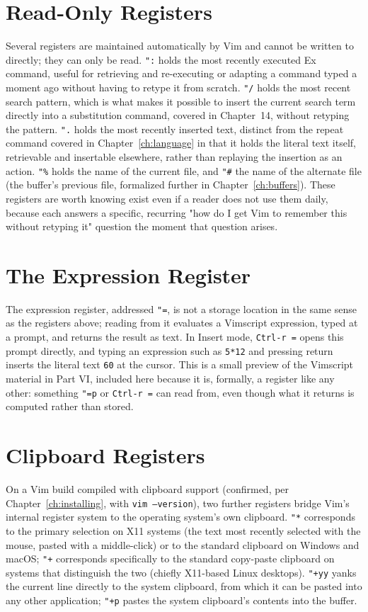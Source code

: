 \section{Read-Only Registers}

Several registers are maintained automatically by Vim and cannot be written to directly; they can only be read. \texttt{":} holds the most recently executed Ex command, useful for retrieving and re-executing or adapting a command typed a moment ago without having to retype it from scratch. \texttt{"/} holds the most recent search pattern, which is what makes it possible to insert the current search term directly into a substitution command, covered in Chapter~14, without retyping the pattern. \texttt{".} holds the most recently inserted text, distinct from the repeat command covered in Chapter~\ref{ch:language} in that it holds the literal text itself, retrievable and insertable elsewhere, rather than replaying the insertion as an action. \texttt{"\%} holds the name of the current file, and \texttt{"\#} the name of the alternate file (the buffer's previous file, formalized further in Chapter~\ref{ch:buffers}). These registers are worth knowing exist even if a reader does not use them daily, because each answers a specific, recurring "how do I get Vim to remember this without retyping it" question the moment that question arises.

\section{The Expression Register}

The expression register, addressed \texttt{"=}, is not a storage location in the same sense as the registers above; reading from it evaluates a Vimscript expression, typed at a prompt, and returns the result as text. In Insert mode, \texttt{Ctrl-r =} opens this prompt directly, and typing an expression such as \texttt{5*12} and pressing return inserts the literal text \texttt{60} at the cursor. This is a small preview of the Vimscript material in Part VI, included here because it is, formally, a register like any other: something \texttt{"=p} or \texttt{Ctrl-r =} can read from, even though what it returns is computed rather than stored.

\section{Clipboard Registers}

On a Vim build compiled with clipboard support (confirmed, per Chapter~\ref{ch:installing}, with \texttt{vim --version}), two further registers bridge Vim's internal register system to the operating system's own clipboard. \texttt{"*} corresponds to the primary selection on X11 systems (the text most recently selected with the mouse, pasted with a middle-click) or to the standard clipboard on Windows and macOS; \texttt{"+} corresponds specifically to the standard copy-paste clipboard on systems that distinguish the two (chiefly X11-based Linux desktops). \texttt{"+yy} yanks the current line directly to the system clipboard, from which it can be pasted into any other application; \texttt{"+p} pastes the system clipboard's contents into the buffer.

